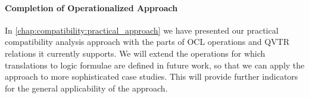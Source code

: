 \paragraph{Completion of Operationalized Approach}
\label{chap:futurework:correctness:compatibility:completion}
In \autoref{chap:compatibility:practical_approach} we have presented our practical compatibility analysis approach with the parts of \gls{OCL} operations and \gls{QVTR} relations it currently supports.
We will extend the operations for which translations to logic formulae are defined in future work, so that we can apply the approach to more sophisticated case studies.
This will provide further indicators for the general applicability of the approach.



